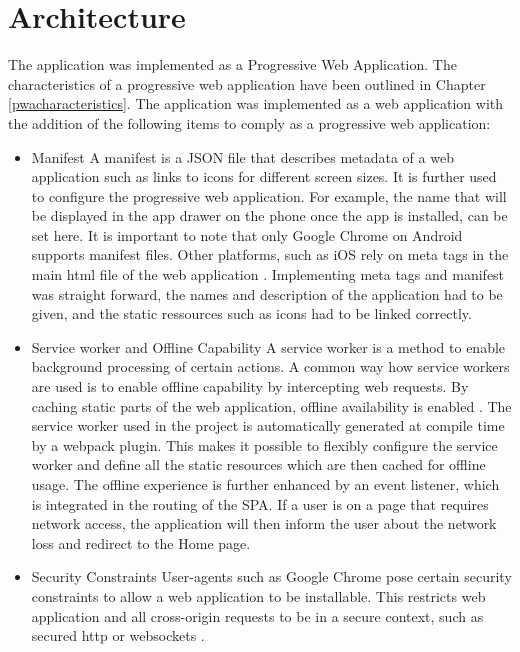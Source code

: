 \section{Architecture\label{architecture}}
The application was implemented as a Progressive Web Application. The characteristics of a progressive web application have been outlined in Chapter \ref{pwacharacteristics}. The application was implemented as a web application with the addition of the following items to comply as a progressive web application:
\begin{itemize}
\item Manifest
A manifest is a JSON file that describes metadata of a web application such as links to icons for different screen sizes. It is further used to configure the progressive web application. For example, the name that will be displayed in the app drawer on the phone once the app is installed, can be set here. It is important to note that only Google Chrome on Android supports manifest files. \cite{manifest} Other platforms, such as iOS rely on meta tags in the main html file of the web application \cite{applemetatags}. Implementing meta tags and manifest was straight forward, the names and description of the application had to be given, and the static ressources such as icons had to be linked correctly.
\item Service worker and Offline Capability
A service worker is a method to enable background processing of certain actions. A common way how service workers are used is to enable offline capability by intercepting web requests. By caching static parts of the web application, offline availability is enabled \cite{serviceworkers}. The service worker used in the project is automatically generated at compile time by a webpack plugin. This makes it possible to flexibly configure the service worker and define all the static resources which are then cached for offline usage. The offline experience is further enhanced by an event listener, which is integrated in the routing of the SPA. If a user is on a page that requires network access, the application will then inform the user about the network loss and redirect to the Home page.

\item Security Constraints
User-agents such as Google Chrome pose certain security constraints to allow a web application to be installable. This restricts web application and all cross-origin requests to be in a secure context, such as secured http or websockets \cite{manifest} \cite{securitychrome}.
\end{itemize}

